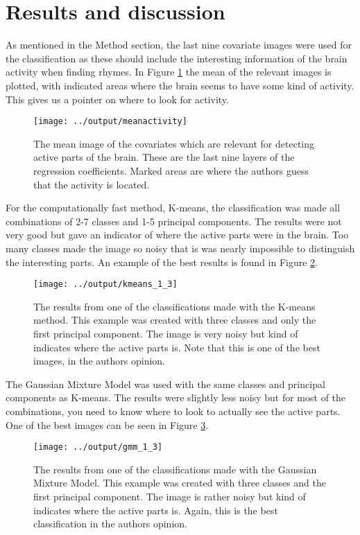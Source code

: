 \documentclass[a4paper,english]{article}
\begin{document}
\section{Results and discussion}

As mentioned in the Method section, the last nine covariate images were used for the classification as these should include the interesting information of the brain activity when finding rhymes. In Figure \ref{fig:mean} the mean of the relevant images is plotted, with indicated areas where the brain seems to have some kind of activity. This gives us a pointer on where to look for activity.

\begin{figure}[H]
	\centering
    \texttt{[image: ../output/meanactivity]}
    \caption{The mean image of the covariates which are relevant for detecting active parts of the brain. These are the last nine layers of the regression coefficients. Marked areas are where the authors guess that the activity is located.}
    \label{fig:mean}
\end{figure}

For the computationally fast method, K-means, the classification was made all combinations of 2-7 classes and 1-5 principal components. The results were not very good but gave an indicator of where the active parts were in the brain. Too many classes made the image so noisy that is was nearly impossible to distinguish the interesting parts. An example of the best results is found in Figure \ref{fig:kmeans}.

\begin{figure}[H]
	\centering
    \texttt{[image: ../output/kmeans\_1\_3]}
    \caption{The results from one of the classifications made with the K-means method. This example was created with three classes and only the first principal component. The image is very noisy but kind of indicates where the active parts is. Note that this is one of the best images, in the authors opinion.}
    \label{fig:kmeans}
\end{figure}

The Gaussian Mixture Model was used with the same classes and principal components as K-means. The results were slightly less noisy but for most of the combinations, you need to know where to look to actually see the active parts. One of the best images can be seen in Figure \ref{fig:gmm}.

\begin{figure}[H]
  \centering
  \texttt{[image: ../output/gmm\_1\_3]}
  \caption{The results from one of the classifications made with the Gaussian Mixture Model. This example was created with three classes and the first principal component. The image is rather noisy but kind of indicates where the active parts is. Again, this is the best classification in the authors opinion.}
  \label{fig:gmm}
\end{figure}
\end{document}
